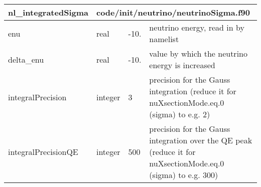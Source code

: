 \documentclass{article}
\begin{document}
\begin{longtable}{llll}
\toprule
\textbf{\large{nl\_integratedSigma}} & \multicolumn{3}{l}{\footnotesize{code/init/neutrino/neutrinoSigma.f90}}\\*
\midrule
\endfirsthead
\midrule
\endhead
enu & \begin{minipage}[t]{2cm}real\end{minipage} & \begin{minipage}[t]{2cm}-10.\end{minipage} & \begin{minipage}[t]{12cm}neutrino energy, read in by namelist\end{minipage}\\*
\midrule
delta\_enu & \begin{minipage}[t]{2cm}real\end{minipage} & \begin{minipage}[t]{2cm}-10.\end{minipage} & \begin{minipage}[t]{12cm}value by which the neutrino energy is increased\end{minipage}\\*
\midrule
integralPrecision & \begin{minipage}[t]{2cm}integer\end{minipage} & \begin{minipage}[t]{2cm}3\end{minipage} & \begin{minipage}[t]{12cm}precision for the Gauss integration (reduce it for nuXsectionMode.eq.0 (sigma) to e.g. 2)\end{minipage}\\*
\midrule
integralPrecisionQE & \begin{minipage}[t]{2cm}integer\end{minipage} & \begin{minipage}[t]{2cm}500\end{minipage} & \begin{minipage}[t]{12cm}precision for the Gauss integration over the QE peak (reduce it for nuXsectionMode.eq.0 (sigma) to e.g. 300)\end{minipage}\\*
\bottomrule
\end{longtable}
{ }



\end{document}
